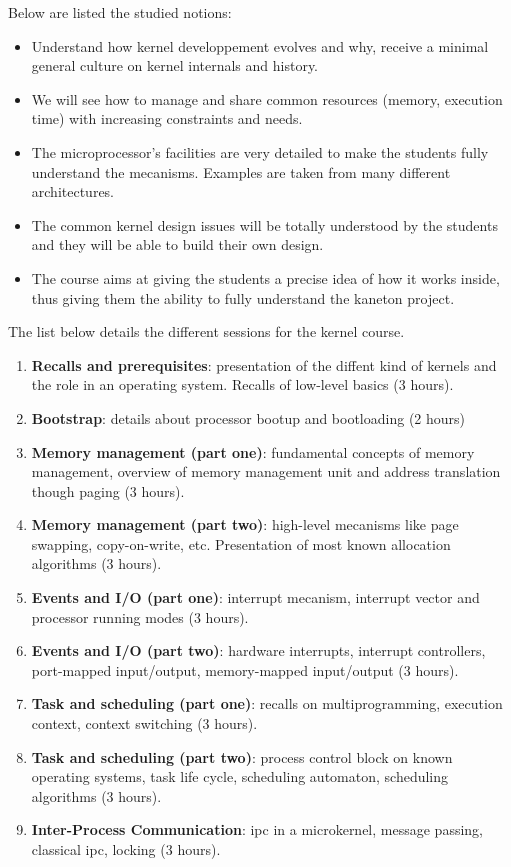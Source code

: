 \begin{multicols}{2}
Below are listed the studied notions:

\begin{itemize}
  \item
    Understand how kernel developpement evolves and why, receive a
    minimal general culture on kernel internals and history.
  \item
    We will see how to manage and share common resources (memory,
    execution time) with increasing constraints and needs.
  \item
    The microprocessor's facilities are very detailed to make the
    students fully understand the mecanisms. Examples are taken from
    many different architectures.
  \item
    The common kernel design issues will be totally understood by the
    students and they will be able to build their own design.
  \item
    The course aims at giving the students a precise idea of how it
    works inside, thus giving them the ability to fully understand
    the kaneton project.
\end{itemize}

The list below details the different sessions for the kernel course.

\begin{enumerate}
  \item
    \textbf{Recalls and prerequisites}: presentation of the diffent
    kind of kernels and the role in an operating system. Recalls of
    low-level basics (3 hours).
  \item
    \textbf{Bootstrap}: details about processor bootup and bootloading
    (2 hours)
\item
    \textbf{Memory management (part one)}: fundamental concepts of
    memory management, overview of memory management unit and address
    translation though paging (3 hours).
  \item
    \textbf{Memory management (part two)}: high-level mecanisms like
    page swapping, copy-on-write, etc. Presentation of most known
    allocation algorithms (3 hours).
  \item
    \textbf{Events and I/O (part one)}: interrupt mecanism, interrupt
    vector and processor running modes (3 hours).
  \item
    \textbf{Events and I/O (part two)}: hardware interrupts, interrupt
    controllers, port-mapped input/output, memory-mapped input/output
    (3 hours).
  \item
    \textbf{Task and scheduling (part one)}: recalls on
    multiprogramming, execution context, context switching (3 hours).
  \item
    \textbf{Task and scheduling (part two)}: process control block on
    known operating systems, task life cycle, scheduling automaton,
    scheduling algorithms (3 hours).
  \item
    \textbf{Inter-Process Communication}: ipc in a microkernel,
    message passing, classical ipc, locking (3 hours).
\end{enumerate}


\end{multicols}
